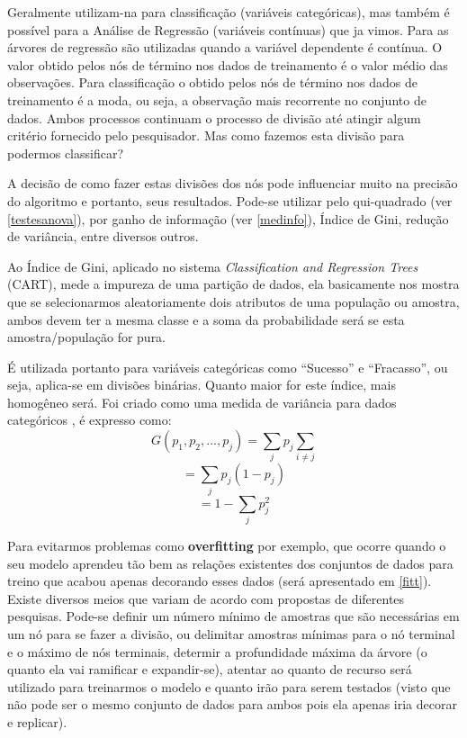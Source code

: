 \documentclass[
]{book}
\begin{document}
Geralmente utilizam-na para classificação (variáveis categóricas), mas também é possível para a Análise de Regressão (variáveis contínuas) que ja vimos. Para as árvores de regressão são utilizadas quando a variável dependente é contínua. O valor obtido pelos nós de término nos dados de treinamento é o valor médio das observações. Para classificação o obtido pelos nós de término nos dados de treinamento é a moda, ou seja, a observação mais recorrente no conjunto de dados. Ambos processos continuam o processo de divisão até atingir algum critério fornecido pelo pesquisador. Mas como fazemos esta divisão para podermos classificar?

A decisão de como fazer estas divisões dos nós pode influenciar muito na precisão do algoritmo e portanto, seus resultados. Pode-se utilizar pelo qui-quadrado (ver \ref{testesanova}), por ganho de informação (ver \ref{medinfo}), Índice de Gini, redução de variância, entre diversos outros.

Ao Índice de Gini, aplicado no sistema \emph{Classification and Regression Trees} (CART)\citep{breiman1984classification}, mede a impureza de uma partição de dados, ela basicamente nos mostra que se selecionarmos aleatoriamente dois atributos de uma população ou amostra, ambos devem ter a mesma classe e a soma da probabilidade será se esta amostra/população for pura.

É utilizada portanto para variáveis categóricas como ``Sucesso'' e ``Fracasso'', ou seja, aplica-se em divisões binárias. Quanto maior for este índice, mais homogêneo será. Foi criado como uma medida de variância para dados categóricos \citep{light1971analysis}, é expresso como:
\[G(p_1,p_2,...,p_j)=\displaystyle \sum_{j}p_j  \sum_{i\neq j}\]
\[= \displaystyle \sum_j p_j(1-p_j) \]
\begin{equation}
= \displaystyle 1-\sum_j p^2_j
\label{eq:indgini1}
\end{equation}

Para evitarmos problemas como \textbf{overfitting} por exemplo, que ocorre quando o seu modelo aprendeu tão bem as relações existentes dos conjuntos de dados para treino que acabou apenas decorando esses dados (será apresentado em \ref{fitt}). Existe diversos meios que variam de acordo com propostas de diferentes pesquisas. Pode-se definir um número mínimo de amostras que são necessárias em um nó para se fazer a divisão, ou delimitar amostras mínimas para o nó terminal e o máximo de nós terminais, determir a profundidade máxima da árvore (o quanto ela vai ramificar e expandir-se), atentar ao quanto de recurso será utilizado para treinarmos o modelo e quanto irão para serem testados (visto que não pode ser o mesmo conjunto de dados para ambos pois ela apenas iria decorar e replicar).
\end{document}
